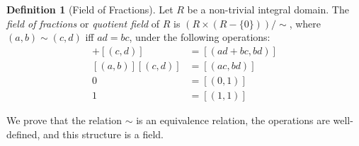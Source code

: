 \documentclass{article}
\theoremstyle{definition}
\newtheorem{definition}[axiom]{Definition}
\begin{document}
    \begin{definition}[Field of Fractions]
        Let $R$ be a non-trivial integral domain. The \emph{field of fractions} or \emph{quotient field} of $R$ is $(R \times (R - \{ 0 \})) / \sim$,
        where $(a,b) \sim (c,d)$ iff $ad = bc$, under the following operations:
        \begin{align*}
            [(a,b)] + [(c,d)] & = [(ad+bc,bd)] \\
            [(a,b)][(c,d)] & = [(ac,bd)] \\
            0 & = [(0,1)] \\
            1 & = [(1,1)]
        \end{align*}

        We prove that the relation $\sim$ is an equivalence relation, the operations are well-defined, and this
        structure is a field.
    \end{definition}
\end{document}
